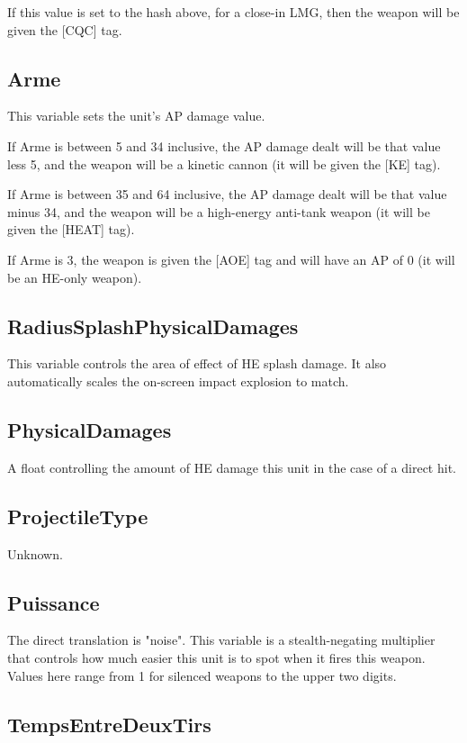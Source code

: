 \documentclass{article}
\begin{document}
If this value is set to the hash above, for a close-in LMG, then the weapon will be given the [CQC] tag.

\subsection{Arme}

This variable sets the unit's AP damage value.

If Arme is between 5 and 34 inclusive, the AP damage dealt will be that value less 5, and the weapon will be a kinetic cannon (it will be given the [KE] tag).

If Arme is between 35 and 64 inclusive, the AP damage dealt will be that value minus 34, and the weapon will be a high-energy anti-tank weapon (it will be given the [HEAT] tag).

If Arme is 3, the weapon is given the [AOE] tag and will have an AP of 0 (it will be an HE-only weapon).

\subsection{RadiusSplashPhysicalDamages}

This variable controls the area of effect of HE splash damage. It also automatically scales the on-screen impact explosion to match.

\subsection{PhysicalDamages}

A float controlling the amount of HE damage this unit in the case of a direct hit.

\subsection{ProjectileType}

Unknown.

\subsection{Puissance}

The direct translation is "noise". This variable is a stealth-negating multiplier that controls how much easier this unit is to spot when it fires this weapon. Values here range from 1 for silenced weapons to the upper two digits.

\subsection{TempsEntreDeuxTirs}
\end{document}
